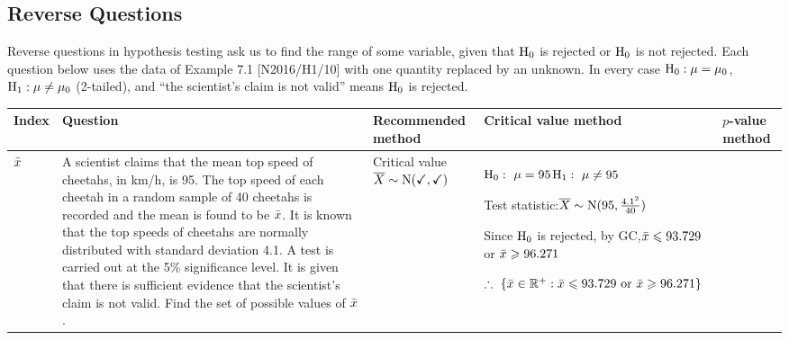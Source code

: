 \begin{landscape}
\section{Reverse Questions}
\noindent Reverse questions in hypothesis testing ask us to find the range of some variable, given that $\mathrm{H}_{0}$ is rejected or $\mathrm{H}_{0}$ is not rejected. Each question below uses the data of Example 7.1 [N2016/H1/10] with one quantity replaced by an unknown. In every case $\mathrm{H}_{0}:\mu=\mu_{0}$, $\mathrm{H}_{1}:\mu\neq\mu_{0}$ (2-tailed), and ``the scientist's claim is not valid'' means $\mathrm{H}_{0}$ is rejected.\par\smallskip
{\renewcommand{\arraystretch}{1.15}\scriptsize
\setlength{\jot}{1pt}
\begin{longtable}{|M{1.0cm}|L{5.0cm}|L{2.3cm}|L{6.4cm}|L{6.4cm}|}\hline
\textbf{Index} & \textbf{Question} & \textbf{Recommended method} & \textbf{Critical value method} & \textbf{$p$-value method}\\\hline\hline\endhead
$\bar{x}$ &
A scientist claims that the mean top speed of cheetahs, in km/h, is 95. The top speed of each cheetah in a random sample of 40 cheetahs is recorded and the mean is found to be $\bar{x}$. It is known that the top speeds of cheetahs are normally distributed with standard deviation 4.1. A test is carried out at the 5\% significance level. It is given that there is sufficient evidence that the scientist's claim is not valid. Find the set of possible values of $\bar{x}$. &
Critical value\newline $\overline{X}\sim\mathrm{N}(\checkmark,\checkmark)$ &
$\mathrm{H}_{0}:\ \mu=95$\newline $\mathrm{H}_{1}:\ \mu\neq95$\par\smallskip Test statistic:\newline $\overline{X}\sim\mathrm{N}(95,\tfrac{4.1^{2}}{40})$\par{\centering{}\par}Since $\mathrm{H}_{0}$ is rejected, by GC,\newline $\bar{x}\leqslant93.729$ or $\bar{x}\geqslant96.271$\par\smallskip $\therefore\ \{\xb\in\mathbb{R}^{+}:\xb\leqslant93.729\text{ or }\xb\geqslant96.271\}$ &

\end{longtable}}
\end{landscape}
